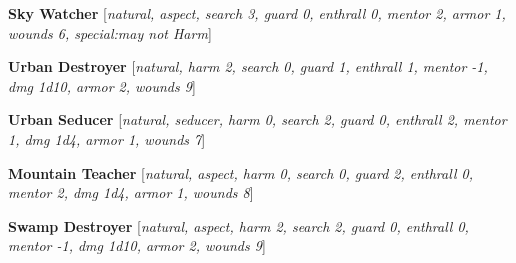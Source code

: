 \documentclass[oneside,10pt]{article}
\begin{document}
\begin{multicols}{2}
\textbf{Sky Watcher} [\textit{natural, aspect, search 3, guard 0, enthrall 0,
mentor 2, armor 1, wounds 6, special:may not
Harm}]

\textbf{Urban Destroyer} [\textit{natural, harm 2, search 0, guard 1, enthrall
1, mentor -1, dmg 1d10, armor 2, wounds 9}]

\textbf{Urban Seducer} [\textit{natural, seducer, harm 0, search 2, guard 0,
enthrall 2, mentor 1, dmg 1d4, armor 1, wounds 7}]

\textbf{Mountain Teacher} [\textit{natural, aspect, harm 0, search 0, guard
2, enthrall 0, mentor 2, dmg 1d4, armor 1, wounds
8}]

\textbf{Swamp Destroyer} [\textit{natural, aspect, harm 2, search 2, guard
0, enthrall 0, mentor -1, dmg 1d10, armor 2,
wounds 9}]


\end{multicols}

\newpage

\end{document}
